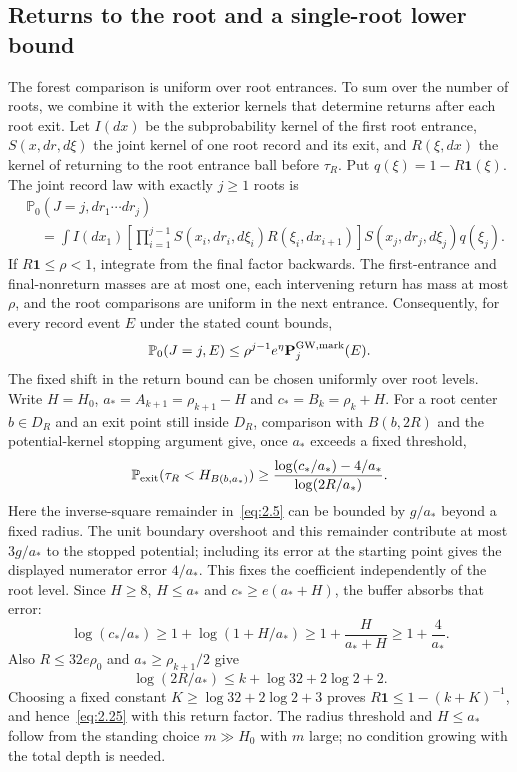 \documentclass[11pt,a4paper]{article}
\numberwithin{equation}{section}
\theoremstyle{remark}
\begin{document}
\subsection{Returns to the root and a single-root lower bound}\label{sec:roots}
The forest comparison is uniform over root entrances. To sum over the number of roots, we combine it with the exterior kernels that determine returns after each root exit. Let $I(dx)$ be the subprobability kernel of the first root entrance, $S(x,dr,d\xi)$ the joint kernel of one root record and its exit, and $R(\xi,dx)$ the kernel of returning to the root entrance ball before $\tau_R$. Put $q(\xi)=1-R\mathbf1(\xi)$. The joint record law with exactly $j\ge1$ roots is
\begin{equation}\label{eq:root-record-kernel}
\begin{split}
&\mathbb P_0(J=j,dr_1\cdots dr_j)\\
&\quad=\int I(dx_1)
\left[\prod_{i=1}^{j-1}S(x_i,dr_i,d\xi_i)R(\xi_i,dx_{i+1})\right]
S(x_j,dr_j,d\xi_j)q(\xi_j).
\end{split}
\end{equation}
If $R\mathbf1\le\rho<1$, integrate from the final factor backwards. The first-entrance and final-nonreturn masses are at most one, each intervening return has mass at most $\rho$, and the root comparisons are uniform in the next entrance. Consequently, for every record event $E$ under the stated count bounds,
\begin{equation}\label{eq:2.25}
\mathbb P_0(J=j,E)\le \rho^{j-1}e^\eta\mathbf P_j^{\rm GW,mark}(E).
\end{equation}
The fixed shift in the return bound can be chosen uniformly over root levels. Write $H=H_0$, $a_*=A_{k+1}=\rho_{k+1}-H$ and $c_*=B_k=\rho_k+H$. For a root center $b\in D_R$ and an exit point still inside $D_R$, comparison with $B(b,2R)$ and the potential-kernel stopping argument give, once $a_*$ exceeds a fixed threshold,
\[
\mathbb P_{\rm exit}(\tau_R<H_{B(b,a_*)})
\ge\frac{\log(c_*/a_*)-4/a_*}{\log(2R/a_*)}.
\]
Here the inverse-square remainder in~\eqref{eq:2.5} can be bounded by $g/a_*$ beyond a fixed radius. The unit boundary overshoot and this remainder contribute at most $3g/a_*$ to the stopped potential; including its error at the starting point gives the displayed numerator error $4/a_*$. This fixes the coefficient independently of the root level.
Since $H\ge8$, $H\le a_*$ and $c_*\ge e(a_*+H)$, the buffer absorbs that error:
\[
\log(c_*/a_*)\ge1+\log(1+H/a_*)
\ge1+\frac{H}{a_*+H}\ge1+\frac4{a_*}.
\]
Also $R\le32e\rho_0$ and $a_*\ge\rho_{k+1}/2$ give
\[
\log(2R/a_*)\le k+\log32+2\log2+2.
\]
Choosing a fixed constant $K\ge\log32+2\log2+3$ proves $R\mathbf1\le1-(k+K)^{-1}$, and hence~\eqref{eq:2.25} with this return factor. The radius threshold and $H\le a_*$ follow from the standing choice $m\gg H_0$ with $m$ large; no condition growing with the total depth is needed.
\end{document}
